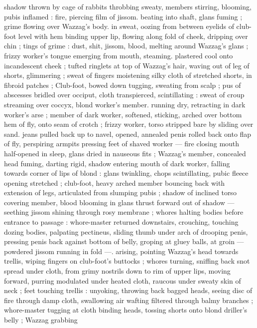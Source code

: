 shadow thrown by cage of rabbits throbbing sweaty, members 
stirring, blooming, pubis inflamed : fire, piercing film of jissom. 
beating into shaft, glans fuming ; grime flowing over Wazzag's body. 
in sweat, oozing from between eyelids of club-foot level with hem 
binding upper lip, flowing along fold of cheek, dripping over chin ; 
tings of grime : dust, shit, jissom, blood, melting around Wazzag's 
glans ; frizzy worker's tongue emerging from mouth, steaming. 
plastered cool onto incandescent cheek ; tufted ringlets at top of 
Wazzag's hair, waving out of leg of shorts, glimmering ; sweat of 
fingers moistening silky cloth of stretched shorts, in fibroid patches 
; Club-foot, bowed down tugging, sweating from scalp ; pus of 
abscesses bridled over occiput, cloth transpierced, scintillating : 
sweat of croup streaming over coccyx, blond worker's member. 
running dry, retracting in dark worker's arse ; member of dark 
worker, softened, sticking, arched over bottom hem of fly, onto seam 
of crotch ; frizzy worker, torso stripped bare by sliding over sand. 
jeans pulled back up to navel, opened, annealed penis rolled back 
onto flap of fly, perspiring armpits pressing feet of shaved worker --- 
fire closing mouth half-opened in sleep, glans dried in nauseous fits 
; Wazzag's member, concealed head fuming, darting rigid, shadow 
entering mouth of dark worker, falling towards corner of lips of 
blond : glans twinkling, chops scintillating, pubic fleece opening 
stretched ; club-foot, heavy arched member bouncing back with 
extension of legs, articulated from slumping pubis ; shadow of 
inclined torso covering member, blood blooming in glans thrust 
forward out of shadow --- seething jissom shining through rosy 
membrane ; whores halting bodies before entrance to passage : 
whore-master returned downstairs, crouching, touching dozing 
bodies, palpating pectineus, sliding thumb under arch of drooping 
penis, pressing penis back against bottom of belly, groping at gluey 
balls, at groin --- powdered jissom running in fold ---. arising, 
pointing Wazzag's head towards trellis, wiping fingers on club-foot's 
buttocks ; whores turning, sniffing back snot spread under cloth, 
from grimy nostrils down to rim of upper lips, moving forward, 
purring modulated under heated cloth, raucous under sweaty skin of 
neck ; feet touching trellis : unyoking, throwing back bagged heads, 
seeing disc of fire through damp cloth, swallowing air wafting filtered 
through balmy branches ; whore-master tugging at cloth binding 
heads, tossing shorts onto blond driller's belly ; Wazzag grabbing 
